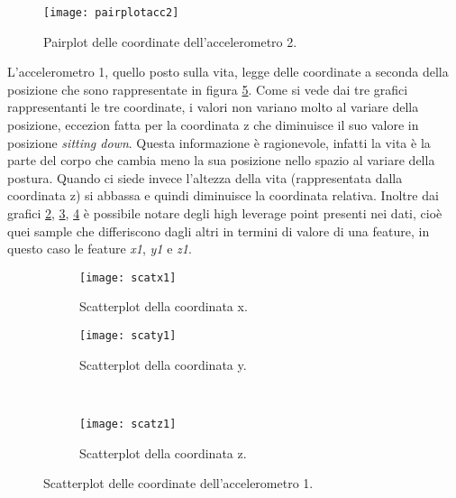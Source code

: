 \begin{figure}[h]
    \centering\texttt{[image: pairplotacc2]}
    \caption{Pairplot delle coordinate dell'accelerometro 2.}
    \label{fig:pairplot}
\end{figure}

L'accelerometro 1, quello posto sulla vita, legge delle coordinate a seconda della posizione che sono rappresentate in figura \ref{fig:scatterplot}. Come si vede dai tre grafici rappresentanti le tre coordinate, i valori non variano molto al variare della posizione, eccezion fatta per la coordinata z che diminuisce il suo valore in posizione \textit{sitting down}. Questa informazione è ragionevole, infatti la vita è la parte del corpo che cambia meno la sua posizione nello spazio al variare della postura.  Quando ci siede invece l'altezza della vita (rappresentata dalla coordinata z) si abbassa e quindi diminuisce la coordinata relativa. Inoltre dai grafici \ref{fig:scatterplot:x1}, \ref{fig:scatterplot:y1}, \ref{fig:scatterplot:z1} è possibile notare degli high leverage point presenti nei dati, cioè quei sample che differiscono dagli altri in termini di valore di una feature, in questo caso le feature \textit{x1}, \textit{y1} e \textit{z1}.

\begin{figure}[h]
    \centering
    \begin{subfigure}[t]{0.4\textwidth}
        \centering\texttt{[image: scatx1]}
        \caption{Scatterplot della coordinata x.}
        \label{fig:scatterplot:x1}
    \end{subfigure}
    \begin{subfigure}[t]{0.4\textwidth}
        \centering\texttt{[image: scaty1]}
        \caption{Scatterplot della coordinata y.}
        \label{fig:scatterplot:y1}
    \end{subfigure}
    \\
    \begin{subfigure}[t]{0.4\textwidth}
        \centering\texttt{[image: scatz1]}
        \caption{Scatterplot della coordinata z.}
        \label{fig:scatterplot:z1}
    \end{subfigure}
    \caption{Scatterplot delle coordinate dell'accelerometro 1.}
    \label{fig:scatterplot}
\end{figure}


